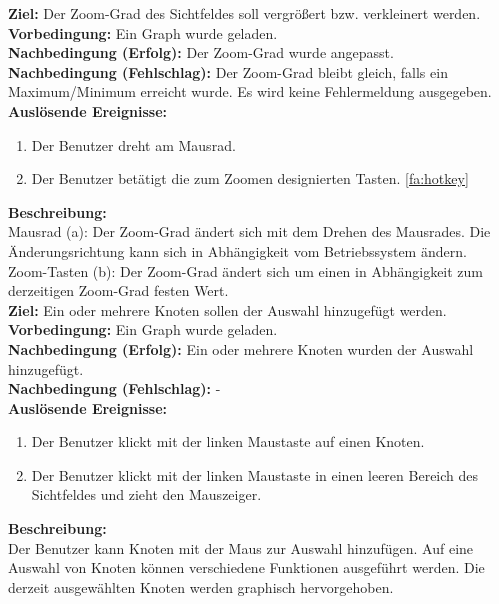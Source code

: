 \label{fa:zoom}
\textbf{Ziel:} Der Zoom-Grad des Sichtfeldes soll vergrößert bzw. verkleinert werden.\\
\textbf{Vorbedingung:} Ein Graph wurde geladen.\\
\textbf{Nachbedingung (Erfolg):} Der Zoom-Grad wurde angepasst.\\
\textbf{Nachbedingung (Fehlschlag):} Der Zoom-Grad bleibt gleich, falls ein Maximum/Minimum erreicht wurde. Es wird keine Fehlermeldung ausgegeben.\\
\textbf{Auslösende Ereignisse:}
\begin{enumerate}[nolistsep, label=(\alph*)]
  \item Der Benutzer dreht am Mausrad.
  \item Der Benutzer betätigt die zum Zoomen designierten Tasten. \ref{fa:hotkey}
\end{enumerate}
\textbf{Beschreibung:}\\
Mausrad (a): Der Zoom-Grad ändert sich mit dem Drehen des Mausrades. Die Änderungsrichtung kann sich in Abhängigkeit vom Betriebssystem ändern.\\
Zoom-Tasten (b): Der Zoom-Grad ändert sich um einen in Abhängigkeit zum derzeitigen Zoom-Grad festen Wert.\\

\label{fa:selekt_knoten}
\textbf{Ziel:} Ein oder mehrere Knoten sollen der Auswahl hinzugefügt werden.\\
\textbf{Vorbedingung:} Ein Graph wurde geladen.\\
\textbf{Nachbedingung (Erfolg):} Ein oder mehrere Knoten wurden der Auswahl hinzugefügt.\\
\textbf{Nachbedingung (Fehlschlag):} -\\
\textbf{Auslösende Ereignisse:}
\begin{enumerate}[nolistsep, label=(\alph*)]
  \item Der Benutzer klickt mit der linken Maustaste auf einen Knoten.
  \item Der Benutzer klickt mit der linken Maustaste in einen leeren Bereich des Sichtfeldes und zieht den Mauszeiger.
\end{enumerate}
\textbf{Beschreibung:}\\
Der Benutzer kann Knoten mit der Maus zur Auswahl hinzufügen.
Auf eine Auswahl von Knoten können verschiedene Funktionen ausgeführt werden. %
Die derzeit ausgewählten Knoten werden graphisch hervorgehoben.\\

